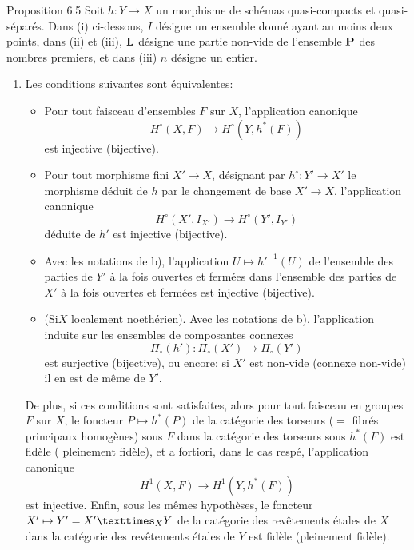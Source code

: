 \documentclass[10pt]{../fichiers-configuration-latex/smfart}
\begin{document}
\begin{enonce*}{Proposition 6.5}
Soit $h:Y\rightarrow X$ un morphisme de schémas quasi-compacts et
quasi-séparés. Dans {\rm(i)} ci-dessous, $I$ désigne un ensemble donné
ayant au moins deux points, dans {\rm(ii)} et {\rm(iii)}, $\mathbf{L}$
désigne une partie non-vide de l'ensemble $\mathbf{P}$ des nombres
premiers, et dans {\rm(iii)} $n$ désigne un entier.
\begin{enumerate}
\renewcommand{\theenumi}{\roman{enumi}}
\renewcommand{\labelenumi}{(\theenumi)}
\item Les conditions suivantes sont équivalentes:
\begin{itemize}
\item[a)] Pour tout faisceau d'ensembles $F$ sur $X$, l'application
canonique
$$
H^{\circ}(X,F)\longrightarrow H^{\circ}(Y,h^{\ast}(F))
$$
est injective (\resp bijective).

\item[b)] Pour tout morphisme fini $X'\rightarrow X$, désignant par
$h^{\circ}:Y'\rightarrow X'$ le morphisme déduit de $h$ par le
changement de base $X'\rightarrow X$, l'application canonique
$$
H^{\circ}(X', I_{X'})\longrightarrow H^{\circ}(Y',I_{Y'})
$$
déduite de $h'$ est injective (\resp bijective).

\item[${\rm b')}$] Avec les notations de {\rm b)}, l'application
$U\mapsto {h'}^{-1}(U)$ de l'ensemble des parties de $Y'$ à la fois
ouvertes et fermées dans l'ensemble des parties de $X'$ à la fois
ouvertes et fermées est injective (\resp bijective).

\item[${\rm b'')}$] (Si\pageoriginale $X$ localement noethérien). 
Avec les notations de {\rm b)}, l'application induite sur 
les ensembles de composantes connexes
$$
\Pi_{\circ}(h'):\Pi_{\circ}(X')\longrightarrow \Pi_{\circ}(Y')
$$
est surjective (\resp bijective), ou encore: si $X'$ est non-vide
(\resp connexe non-vide) il en est de même de $Y'$.
\end{itemize}

De plus, si ces conditions sont satisfaites, alors pour tout faisceau
en groupes $F$ sur $X$, le foncteur $P\mapsto h^{\ast}(P)$ de la
catégorie des torseurs ($=$ fibrés principaux homogènes) sous $F$ dans
la catégorie des torseurs sous $h^{\ast}(F)$ est fidèle (\resp
pleinement fidèle), et a fortiori, dans le cas respé, l'application
canonique
$$
H^1(X,F)\longrightarrow H^1(Y,h^{\ast}(F))
$$
est injective. Enfin, sous les mêmes hypothèses, le foncteur
$X'\mapsto Y'=\fprod{X'}{Y}{X}$ de la catégorie des revêtements étales
de $X$ dans la catégorie des revêtements étales de $Y$ est fidèle
(\resp pleinement fidèle).


\end{enumerate}
\end{enonce*}
\end{document}
